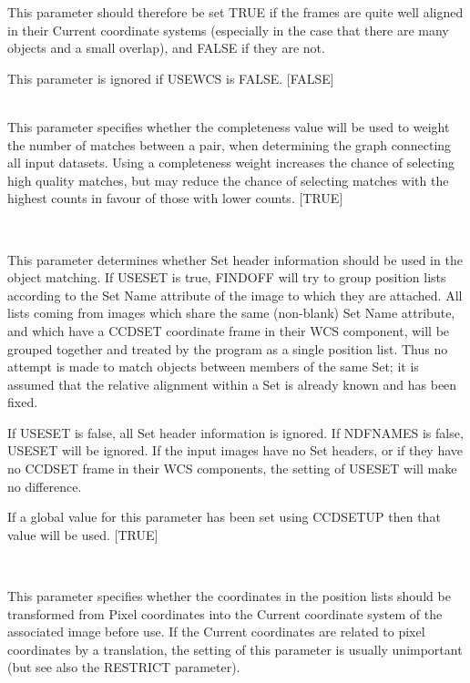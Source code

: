 \documentclass[twoside,11pt]{article}
\renewcommand{\_}{\texttt{\symbol{95}}}
\newcommand{\routine}[1]{{\sc #1}}
\newcommand{\sstsubsection}[1]{ \item[{#1}] \mbox{} \\}
\newcommand{\sstsubsection}[1]{\item[{#1}]}
\begin{document}
{{{         This parameter should therefore be set TRUE if the frames
         are quite well aligned in their Current coordinate systems
         (especially in the case that there are many objects and a
         small overlap), and FALSE if they are not.

         This parameter is ignored if USEWCS is FALSE.
         [FALSE]
      }
      \sstsubsection{
         USECOMP = \_LOGICAL (Read)
      } {
         This parameter specifies whether the completeness value will
         be used to weight the number of matches between a pair, when
         determining the graph connecting all input datasets. Using
         a completeness weight increases the chance of selecting high
         quality matches, but may reduce the chance of selecting matches
         with the highest counts in favour of those with lower counts.
         [TRUE]
      }
      \sstsubsection{
         USESET = \_LOGICAL (Read)
      } {
         This parameter determines whether Set header information should
         be used in the object matching.  If USESET is true, 
         \routine{FINDOFF} will try to group position lists according to
         the Set Name attribute of the image to which they are attached.
         All lists coming from images which share the same (non-blank)
         Set Name attribute, and which have a CCD\_SET coordinate frame 
         in their WCS component, will be grouped together and treated
         by the program as a single position list.  Thus no attempt
         is made to match objects between members of the same Set;
         it is assumed that the relative alignment within a Set 
         is already known and has been fixed.

         If USESET is false, all Set header information is ignored.
         If NDFNAMES is false, USESET will be ignored.  If the input 
         images have no Set headers, or if they have no CCD\_SET frame 
         in their WCS components, the setting of USESET will make
         no difference.

         If a global value for this parameter has been set using 
         CCDSETUP then that value will be used. 
         [TRUE]
      }
      \sstsubsection{
         USEWCS = \_LOGICAL (Read)
      } {
         This parameter specifies whether the coordinates in the
         position lists should be transformed from Pixel coordinates
         into the Current coordinate system of the associated image
         before use.
         If the Current coordinates are related to pixel coordinates
         by a translation, the setting of this parameter is usually
         unimportant (but see also the RESTRICT parameter).

}}}
\end{document}
